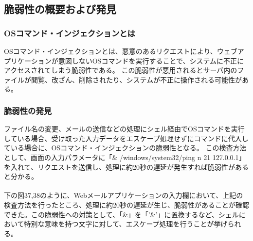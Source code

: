 \documentclass[dvipdfmx,autodetect-engine,titlepage]{jsarticle}
\begin{document}
\subsection{脆弱性の概要および発見}
\subsubsection{OSコマンド・インジェクションとは}
OSコマンド・インジェクションとは、悪意のあるリクエストにより、ウェブアプリケーションが意図しないOSコマンドを実行することで、システムに不正にアクセスされてしまう脆弱性である。
この脆弱性が悪用されるとサーバ内のファイルが閲覧、改ざん、削除されたり、システムが不正に操作される可能性がある。

\subsubsection{脆弱性の発見}
ファイル名の変更、メールの送信などの処理にシェル経由でOSコマンドを実行している場合、受け取った入力データをエスケープ処理せずにコマンドに代入している場合に、OSコマンド・インジェクションの脆弱性となる。
この検査方法として、画面の入力パラメータに「\& /windows/system32/ping \-n 21 127.0.0.1」を入れて、リクエストを送信し、処理に約20秒の遅延が発生すれば脆弱性があると分かる。\\\\
下の図37,38のように、Webメールアプリケーションの入力欄において、上記の検査方法を行ったところ、処理に約20秒の遅延が生じ、脆弱性があることが確認できた。この脆弱性への対策として、「\&」を「'\&'」に置換するなど、シェルにおいて特別な意味を持つ文字に対して、エスケープ処理を行うことが挙げられる。\\
\end{document}
